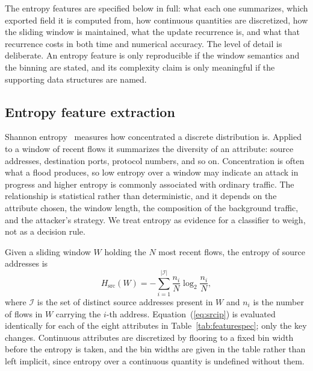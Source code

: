 \documentclass{ieeeaccess}
\begin{document}
The entropy features are specified below in full: what each one summarizes, which exported field it is computed from, how continuous quantities are discretized, how the sliding window is maintained, what the update recurrence is, and what that recurrence costs in both time and numerical accuracy. The level of detail is deliberate. An entropy feature is only reproducible if the window semantics and the binning are stated, and its complexity claim is only meaningful if the supporting data structures are named.

\subsection{Entropy feature extraction} \label{sec:entropyfeatures}
Shannon entropy~\cite{shannon1948mathematical} measures how concentrated a discrete distribution is. Applied to a window of recent flows it summarizes the diversity of an attribute: source addresses, destination ports, protocol numbers, and so on. Concentration is often what a flood produces, so low entropy over a window may indicate an attack in progress and higher entropy is commonly associated with ordinary traffic. The relationship is statistical rather than deterministic, and it depends on the attribute chosen, the window length, the composition of the background traffic, and the attacker's strategy. We treat entropy as evidence for a classifier to weigh, not as a decision rule.

Given a sliding window $W$ holding the $N$ most recent flows, the entropy of source addresses is
\begin{equation}
H_{\mathrm{src}}(W) = -\sum_{i=1}^{|\mathcal{I}|} \frac{n_i}{N} \log_2 \frac{n_i}{N},
\label{eq:srcip}
\end{equation}
where $\mathcal{I}$ is the set of distinct source addresses present in $W$ and $n_i$ is the number of flows in $W$ carrying the $i$-th address. Equation~(\ref{eq:srcip}) is evaluated identically for each of the eight attributes in Table~\ref{tab:featurespec}; only the key changes. Continuous attributes are discretized by flooring to a fixed bin width before the entropy is taken, and the bin widths are given in the table rather than left implicit, since entropy over a continuous quantity is undefined without them.
\end{document}
